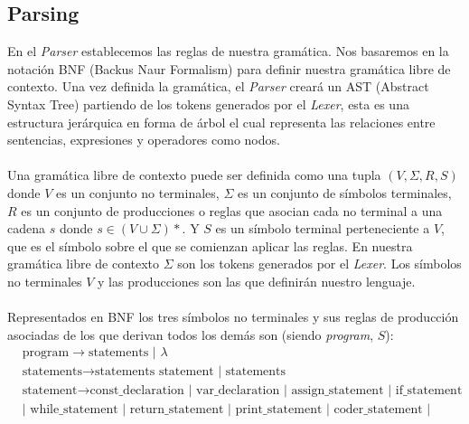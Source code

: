 
\subsection{Parsing}


En el \textit{Parser} establecemos las reglas de nuestra gramática. Nos basaremos en la notación BNF (Backus Naur Formalism) para definir nuestra gramática libre de contexto. Una vez definida la gramática, el \textit{Parser} creará un AST (Abstract Syntax Tree) partiendo de los tokens generados por el \textit{Lexer}, esta es una estructura jerárquica en forma de árbol el cual representa las relaciones entre sentencias, expresiones y operadores como nodos.\\\\
Una gramática libre de contexto puede ser definida como una tupla $(V, \Sigma, R, S)$ donde $V$ es un conjunto no terminales, $\Sigma$ es un conjunto de símbolos terminales, $R$ es un conjunto de producciones o reglas que asocian cada no terminal a una cadena $s$ donde $s \in (V \cup \Sigma)*$. Y $S$ es un símbolo terminal perteneciente a $V$, que es el símbolo sobre el que se comienzan aplicar las reglas. En nuestra gramática libre de contexto $\Sigma$ son los tokens generados por el \textit{Lexer}. Los símbolos no terminales $V$ y las producciones son las que definirán nuestro lenguaje. \\\\
Representados en BNF los tres símbolos no terminales y sus reglas de producción asociadas de los que derivan todos los demás son (siendo \textit{program}, $S$):
\begin{align*}
    &\text{program} \rightarrow \text{statements | $\lambda$ }  \\
    &\text{statements} \rightarrow \text{statements statement | statements }  \\
    &\text{statement} \rightarrow \text{const\_declaration | var\_declaration | assign\_statement | if\_statement }  \\
     &\text{| while\_statement | return\_statement | print\_statement | coder\_statement | decoder\_statement }  \\
\end{align*}
